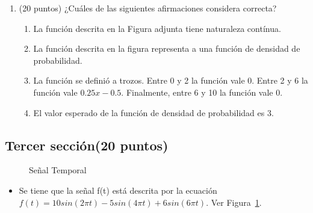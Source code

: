 \documentclass[12pt,a4paper]{article}
\providecommand{\tightlist}{%
  \setlength{\itemsep}{0pt}\setlength{\parskip}{0pt}}\usepackage{longtable,booktabs,array}
\providecommand{\tightlist}{%
  \setlength{\itemsep}{0pt}\setlength{\parskip}{2pt}}
\begin{document}
\begin{enumerate}
\tightlist
\item
  (20 puntos) ¿Cuáles de las siguientes afirmaciones considera correcta?

  \begin{enumerate}
  \tightlist
  \item
    La función descrita en la Figura adjunta tiene naturaleza contínua.
  \item
    La función descrita en la figura representa a una función de
    densidad de probabilidad.
  \item
    La función se definió a trozos. Entre 0 y 2 la función vale 0. Entre
    2 y 6 la función vale \(0.25x - 0.5\). Finalmente, entre 6 y 10 la
    función vale 0.
  \item
    El valor esperado de la función de densidad de probabilidad es 3.
  \end{enumerate}
\end{enumerate}

\subsection{Tercer sección(20 puntos)}\label{tercer-secciuxf3n20-puntos}

\begin{figure}


\caption{\label{fig-señal}Señal Temporal}

\end{figure}%

\begin{itemize}
\tightlist
\item
  Se tiene que la señal f(t) está descrita por la ecuación
  \(f\left(t\right) = 10sin\left(2\pi t\right) - 5sin\left(4\pi t\right)+6sin\left(6\pi t\right)\).
  Ver Figura~\ref{fig-señal}.
\end{itemize}
\end{document}
